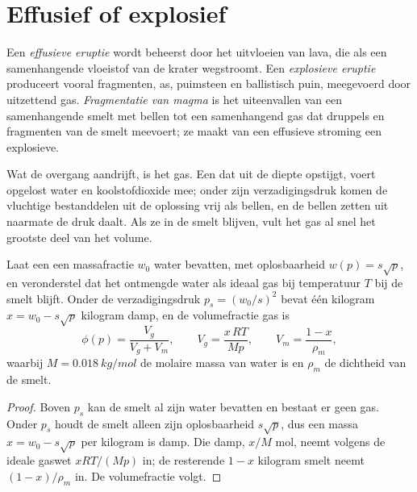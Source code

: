 \section{Effusief of explosief}

\begin{definition}\label{def:b2:eruptive-styles:regimes}
Een \emph{effusieve eruptie} wordt beheerst door het
uitvloeien van lava, die als een samenhangende vloeistof van de krater wegstroomt. Een
\emph{explosieve eruptie} produceert vooral fragmenten,
as, puimsteen en ballistisch puin, meegevoerd door uitzettend gas. \emph{Fragmentatie
van magma} is het uiteenvallen van een samenhangende smelt
met bellen tot een samenhangend gas dat druppels en fragmenten van de smelt meevoert;
ze maakt van een effusieve stroming een explosieve.
\end{definition}

Wat de overgang aandrijft, is het gas. Een  dat uit de diepte opstijgt, voert
opgelost water en koolstofdioxide mee; onder zijn verzadigingsdruk komen de vluchtige bestanddelen
uit de oplossing vrij als bellen, en de bellen zetten uit naarmate de druk daalt.
Als ze in de smelt blijven, vult het gas al snel het grootste deel van het volume.

\begin{proposition}\label{prop:b2:eruptive-styles:gas}
Laat een  een massafractie $w_0$ water bevatten, met oplosbaarheid $w(p) =
s\sqrt p$, en veronderstel dat het ontmengde water als ideaal gas bij temperatuur $T$
bij de smelt blijft. Onder de verzadigingsdruk $p_s = (w_0/s)^2$ bevat één
kilogram  $x = w_0 - s\sqrt p$ kilogram damp, en de
volumefractie gas is
\[
\phi(p) = \frac{V_g}{V_g + V_m}, \qquad V_g = \frac{x\,RT}{M p}, \qquad
V_m = \frac{1 - x}{\rho_m},
\]
waarbij $M = \qty{0.018}{kg/mol}$ de molaire massa van water is en $\rho_m$ de dichtheid
van de smelt.
\end{proposition}

\begin{proof}
Boven $p_s$ kan de smelt al zijn water bevatten en bestaat er geen gas. Onder $p_s$
houdt de smelt alleen zijn oplosbaarheid $s\sqrt p$, dus een massa $x = w_0 - s\sqrt p$ per
kilogram  is damp. Die damp, $x/M$ mol, neemt volgens de ideale gaswet $xRT/(Mp)$ in;
de resterende $1 - x$ kilogram smelt neemt $(1 - x)/\rho_m$ in.
De volumefractie volgt.
\end{proof}

